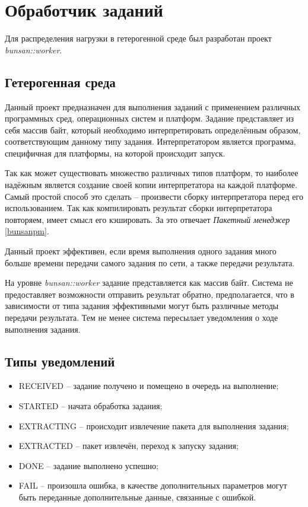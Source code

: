 \section{Обработчик заданий}
\label{bunsanworker}
Для распределения нагрузки в гетерогенной среде
был разработан проект \textit{bunsan::worker}.

\subsection{Гетерогенная среда}
Данный проект предназначен для выполнения заданий
с применением различных программных сред, операционных систем и платформ.
Задание представляет из себя массив байт, который необходимо
интерпретировать определённым образом,
соответствующим данному типу задания. Интерпретатором является
программа, специфичная для платформы, на которой
происходит запуск.

Так как может существовать множество различных
типов платформ, то наиболее надёжным является создание своей копии
интерпретатора на каждой платформе.
Самый простой способ это сделать -- произвести сборку
интерпретатора перед его использованием.
Так как компилировать результат сборки интерпретатора повторяем,
имеет смысл его кэшировать.
За это отвечает \textit{Пакетный менеджер} \ref{bunsanpm}.

Данный проект эффективен,
если время выполнения одного задания много больше
времени передачи самого задания по сети,
а также передачи результата.

На уровне \textit{bunsan::worker} задание
представляется как массив байт. Система
не предоставляет возможности отправить результат
обратно, предполагается, что в зависимости
от типа задания эффективными могут быть различные методы передачи результата.
Тем не менее система пересылает уведомления о ходе выполнения задания.

\subsection{Типы уведомлений}
\begin{itemize}
    \item RECEIVED -- задание получено и помещено в очередь на выполнение;
    \item STARTED -- начата обработка задания;
    \item EXTRACTING -- происходит извлечение пакета для выполнения задания;
    \item EXTRACTED -- пакет извлечён, переход к запуску задания;
    \item DONE -- задание выполнено успешно;
    \item FAIL -- произошла ошибка,
        в качестве дополнительных параметров могут быть переданные дополнительные данные,
        связанные с ошибкой.
\end{itemize}

